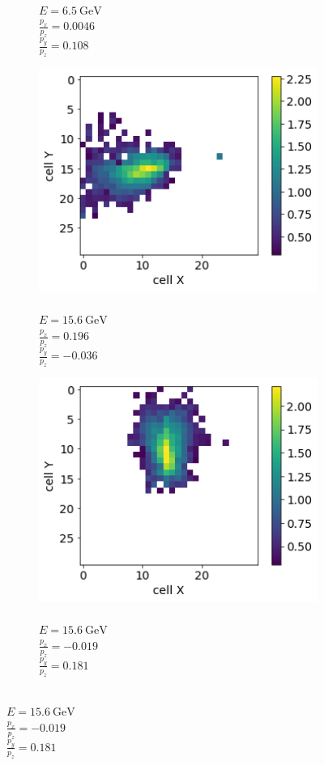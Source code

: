 \begin{figure}
\begin{subfigure}{0.24\textwidth}
    \caption{\\$E = 6.5~\text{GeV}$ \\  $\frac{p_x}{p_z}=0.0046$ \\$\frac{p_y}{p_z}=0.108$}%
  \end{subfigure}
    \begin{subfigure}{0.24\textwidth}
    \centering
    \includegraphics[width=1\textwidth]{figures/3_gen.png}
    \caption{\\$E = 15.6~\text{GeV}$ \\ $\frac{p_x}{p_z}=0.196$ \\ $\frac{p_y}{p_z}=-0.036$}%
  \end{subfigure}
  \begin{subfigure}{0.24\textwidth}
    \centering
    \includegraphics[width=1\textwidth]{figures/4_gen.png}
    \caption{\\$E = 15.6~\text{GeV}$ \\  $\frac{p_x}{p_z}=-0.019$ \\ $\frac{p_y}{p_z}=0.181$}%
  \end{subfigure}
 

\end{figure}
